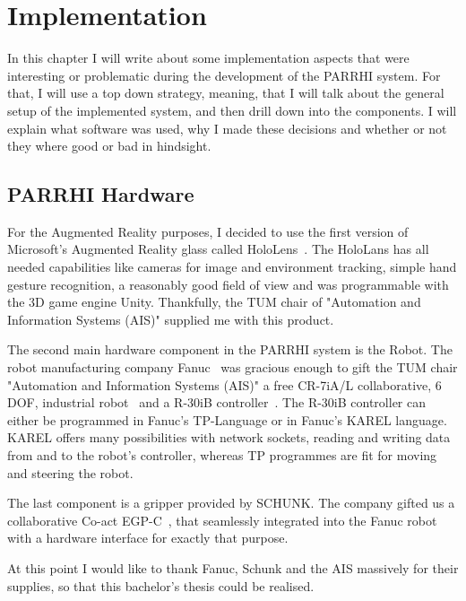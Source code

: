 \chapter{Implementation}\label{Chap:Implementation}

In this chapter I will write about some implementation aspects that were interesting or problematic during the development of the PARRHI system. For that, I will use a top down strategy, meaning, that I will talk about the general setup of the implemented system, and then drill down into the components. I will explain what software was used, why I made these decisions and whether or not they where good or bad in hindsight.

\section{PARRHI Hardware}
For the Augmented Reality purposes, I decided to use the first version of Microsoft's Augmented Reality glass called HoloLens~\cite{HoloLens}. The HoloLans has all needed capabilities like cameras for image and environment tracking, simple hand gesture recognition, a reasonably good field of view and was programmable with the 3D game engine Unity. Thankfully, the TUM chair of "Automation and Information Systems (AIS)" supplied me with this product.

The second main hardware component in the PARRHI system is the Robot. The robot manufacturing company Fanuc~\cite{Fanuc} was gracious enough to gift the TUM chair "Automation and Information Systems (AIS)" a free CR-7iA/L collaborative, 6 DOF, industrial robot~\cite{FanucCR7} and a R-30iB controller~\cite{FanucR30iB}. The R-30iB controller can either be programmed in Fanuc's TP-Language or in Fanuc's KAREL language. KAREL offers many possibilities with network sockets, reading and writing data from and to the robot's controller, whereas TP programmes are fit for moving and steering the robot.

The last component is a gripper provided by SCHUNK. The company gifted us a collaborative Co-act EGP-C~\cite{SchunkGripper}, that seamlessly integrated into the Fanuc robot with a hardware interface for exactly that purpose. 

At this point I would like to thank Fanuc, Schunk and the AIS massively for their supplies, so that this bachelor's thesis could be realised.


